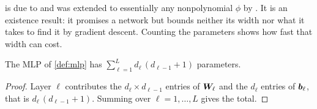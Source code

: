  is due to \citet{cybenko1989} and was extended to essentially any
nonpolynomial $\phi$ by \citet{hornik1989}.
It is an existence result: it promises a network but bounds neither its width nor
what it takes to find it by gradient descent.
Counting the parameters shows how fast that width can cost.

\begin{proposition}
  \label{prop:params}
  The MLP of \cref{def:mlp} has $\sum_{\ell=1}^{L} d_\ell\,(d_{\ell-1} + 1)$
  parameters.
\end{proposition}

\begin{proof}
  Layer $\ell$ contributes the $d_\ell \times d_{\ell-1}$ entries of ${\bm{W}}_\ell$ and
  the $d_\ell$ entries of ${\bm{b}}_\ell$, that is $d_\ell\,(d_{\ell-1} + 1)$. Summing
  over $\ell = 1, \dots, L$ gives the total.
\end{proof}
